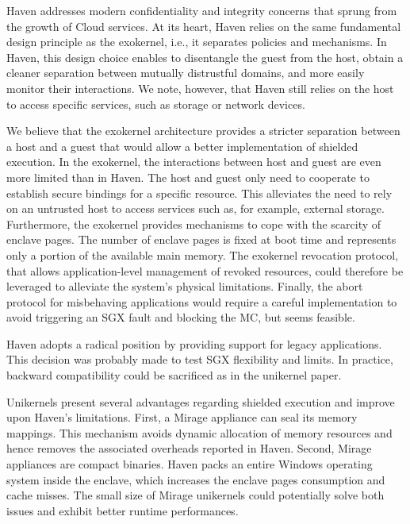 Haven addresses modern confidentiality and integrity concerns that sprung from the growth of Cloud services.
At its heart, Haven relies on the same fundamental design principle as the exokernel, i.e., it separates policies and mechanisms.
In Haven, this design choice enables to disentangle the guest from the host, obtain a cleaner separation between mutually distrustful domains, and more easily monitor their interactions.
We note, however, that Haven still relies on the host to access specific services, such as storage or network devices.

We believe that the exokernel architecture provides a stricter separation between a host and a guest that would allow a better implementation of shielded execution.
In the exokernel, the interactions between host and guest are even more limited than in Haven.
The host and guest only need to cooperate to establish secure bindings for a specific resource.
This alleviates the need to rely on an untrusted host to access services such as, for example, external storage.
Furthermore, the exokernel provides mechanisms to cope with the scarcity of enclave pages.
The number of enclave pages is fixed at boot time and represents only a portion of the available main memory.
The exokernel revocation protocol, that allows application-level management of revoked resources, could therefore be leveraged to alleviate the system's physical limitations.
Finally, the abort protocol for misbehaving applications would require a careful implementation to avoid triggering an SGX fault and blocking the MC, but seems feasible.

Haven adopts a radical position by providing support for legacy applications.
This decision was probably made to test SGX flexibility and limits.
In practice, backward compatibility could be sacrificed as in the unikernel paper.

Unikernels present several advantages regarding shielded execution and improve upon Haven's limitations.
First, a Mirage appliance can seal its memory mappings.
This mechanism avoids dynamic allocation of memory resources and hence removes the associated overheads reported in Haven.
Second, Mirage appliances are compact binaries.
Haven packs an entire Windows operating system inside the enclave, which increases the enclave pages consumption and cache misses.
The small size of Mirage unikernels could potentially solve both issues and exhibit better runtime performances.
